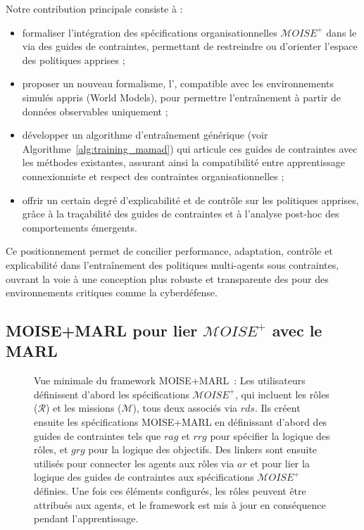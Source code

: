Notre contribution principale consiste à :
\begin{itemize}
    \item formaliser l’intégration des spécifications organisationnelles $\mathcal{M}OISE^+$ dans le  via des guides de contraintes, permettant de restreindre ou d’orienter l’espace des politiques apprises ;
    \item proposer un nouveau formalisme, l’, compatible avec les environnements simulés appris (World Models), pour permettre l’entraînement à partir de données observables uniquement ;
    \item développer un algorithme d’entraînement générique (voir Algorithme~\ref{alg:training_mamad}) qui articule ces guides de contraintes avec les méthodes  existantes, assurant ainsi la compatibilité entre apprentissage connexionniste et respect des contraintes organisationnelles ;
    \item offrir un certain degré d’explicabilité et de contrôle sur les politiques apprises, grâce à la traçabilité des guides de contraintes et à l’analyse post-hoc des comportements émergents.
\end{itemize}

Ce positionnement permet de concilier performance, adaptation, contrôle et explicabilité dans l’entraînement des politiques multi-agents sous contraintes, ouvrant la voie à une conception plus robuste et transparente des  pour des environnements critiques comme la cyberdéfense.

\subsection{MOISE+MARL pour lier $\mathcal{M}OISE^+$ avec le MARL}

\begin{figure}[h!]
    \centering
    
    \caption[Vue minimale du framework MOISE+MARL]{Vue minimale du framework MOISE+MARL~: Les utilisateurs définissent d'abord les spécifications $\mathcal{M}OISE^+$, qui incluent les rôles ($\mathcal{R}$) et les missions ($\mathcal{M}$), tous deux associés via $rds$. Ils créent ensuite les spécifications MOISE+MARL en définissant d'abord des guides de contraintes tels que $rag$ et $rrg$ pour spécifier la logique des rôles, et $grg$ pour la logique des objectifs. Des linkers sont ensuite utilisés pour connecter les agents aux rôles via $ar$ et pour lier la logique des guides de contraintes aux spécifications $\mathcal{M}OISE^+$ définies. Une fois ces éléments configurés, les rôles peuvent être attribués aux agents, et le framework  est mis à jour en conséquence pendant l'apprentissage.
    }
    \label{fig:mm_synthesis}
\end{figure}

